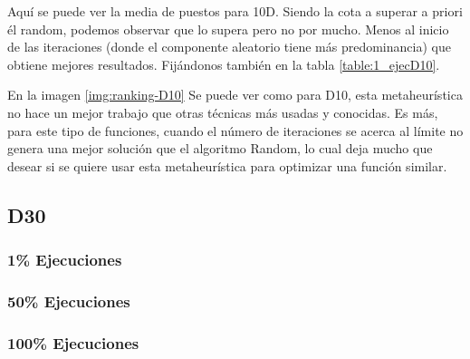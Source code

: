 \documentclass[a4paper, 12.5pt]{report}
\begin{document}
Aquí se puede ver la media de puestos para 10D. Siendo la cota a superar a priori él random, podemos observar que lo supera pero no por mucho. Menos al inicio de las iteraciones (donde el componente aleatorio tiene más predominancia) que obtiene mejores resultados. Fijándonos también en la tabla \ref{table:1_ejecD10}.

En la imagen \ref*{img:ranking-D10} Se puede ver como para D10, esta metaheurística no hace un mejor trabajo que otras técnicas más usadas y conocidas. Es más, para este tipo de funciones, cuando el número de iteraciones se acerca al límite no genera una mejor solución que el algoritmo Random, lo cual deja mucho que desear si se quiere usar esta metaheurística para optimizar una función similar.


\subsection{D30}

\subsubsection*{1\% Ejecuciones}


\subsubsection*{50\% Ejecuciones}


\subsubsection*{100\% Ejecuciones}

\end{document}
